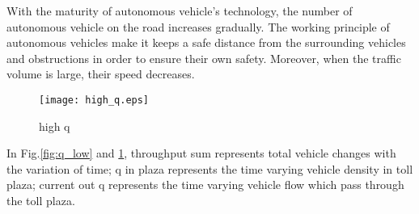 \documentclass{mcmthesis}
\begin{document}
With the maturity of autonomous vehicle’s technology, the number of autonomous vehicle on the road increases gradually. The working principle of autonomous vehicles make it keeps a safe distance from the surrounding vehicles and obstructions in order to ensure their own safety. Moreover, when the traffic volume is large, their speed decreases.
\begin{figure}[!htbp]
	\small
	\centering
	\texttt{[image: high\_q.eps]}
	\caption{\label{fig:q_high}high q} 
\end{figure}

In Fig.\ref{fig:q_low} and \ref{fig:q_high}, throughput sum represents total vehicle changes with the variation of time; q in plaza represents the time varying vehicle density in toll plaza; current out q represents the time varying vehicle flow which pass through the toll plaza.
	
\end{document}
